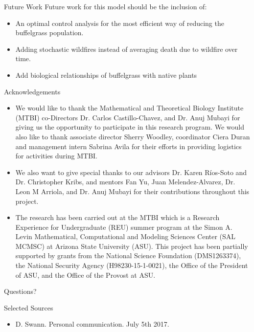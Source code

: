 \documentclass{beamer}
\begin{document}
\begin{frame}{Future Work}
Future work for this model should be the inclusion of:\\
\begin{itemize}
\item An optimal control analysis for the most efficient way of reducing the buffelgrass population.
\item Adding stochastic wildfires instead of averaging death due to wildfire over time. 
\item Add biological relationships of buffelgrass with native plants
\end{itemize}
\end{frame}

\begin{frame}{Acknowledgements}
\begin{itemize}
\item \small{We would like to thank the Mathematical and Theoretical Biology Institute (MTBI) co-Directors Dr. Carlos Castillo-Chavez, and Dr. Anuj Mubayi for giving us the opportunity to participate in this research program. We would also like to thank associate director Sherry Woodley, coordinator Ciera Duran and management intern Sabrina Avila for their efforts in providing logistics for activities during MTBI.}
\item \small{We also want to give special thanks to our advisors Dr. Karen Ríos-Soto and Dr. Christopher Kribs, and mentors Fan Yu, Juan Melendez-Alvarez, Dr. Leon M Arriola, and Dr. Anuj Mubayi for their contributions throughout this project.}
\item \tiny{The research has been carried out at the MTBI which is a Research Experience for Undergraduate (REU) summer program at the Simon A. Levin Mathematical, Computational and Modeling Sciences Center (SAL MCMSC) at Arizona State University (ASU). This project has been partially supported by grants from the National Science Foundation (DMS1263374), the National Security Agency (H98230-15-1-0021), the Office of the President of ASU, and the Office of the Provost at ASU.}
\end{itemize}
\end{frame}

\begin{frame}
\centering
\huge{Questions?}
\end{frame}

\begin{frame}{Selected Sources}

\tiny{

\begin{itemize}
\item D. Swann. Personal communication. July 5th 2017.
\end{itemize}}
\end{frame}
\end{document}
